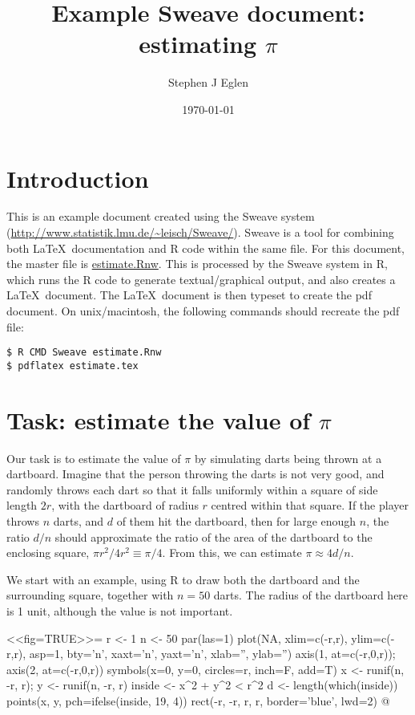 \documentclass[12pt]{article}
\begin{document}
\title{Example Sweave document: estimating $\pi$}
\author{Stephen J Eglen}

\date{\today}
\maketitle

\section{Introduction}

This is an example document created using the Sweave system
(\url{http://www.statistik.lmu.de/~leisch/Sweave/}).  Sweave is a
tool for combining both \LaTeX\ documentation and R code within the
same file.  For this document, the master file is \url{estimate.Rnw}.
This is processed by the Sweave system in R, which runs the R code to
generate textual/graphical output, and also creates a \LaTeX\ document.
The \LaTeX\ document is then typeset to create the pdf document.  On
unix/macintosh, the following commands should recreate the pdf file:

\begin{verbatim}
$ R CMD Sweave estimate.Rnw
$ pdflatex estimate.tex
\end{verbatim}

\section{Task: estimate the value of $\pi$}

Our task is to estimate the value of $\pi$ by simulating darts being
thrown at a dartboard.  Imagine that the person throwing the darts is
not very good, and randomly throws each dart so that it falls
uniformly within a square of side length $2r$, with the dartboard of
radius $r$ centred within that square.  If the player throws $n$
darts, and $d$ of them hit the dartboard, then for large enough $n$,
the ratio $d/n$ should approximate the ratio of the area of the
dartboard to the enclosing square, $ \pi r^2 / 4 r^2 \equiv \pi/4$.
From this, we can estimate $\pi \approx 4d/n$.

We start with an example, using R to draw both the dartboard and the
surrounding square, together with $n=50$ darts.  The radius of the
dartboard here is 1 unit, although the value is not important.

\begin{center}
<<fig=TRUE>>=
r <- 1
n <- 50
par(las=1)
plot(NA, xlim=c(-r,r), ylim=c(-r,r), asp=1, bty='n',
     xaxt='n', yaxt='n', xlab='', ylab='')
axis(1, at=c(-r,0,r)); axis(2, at=c(-r,0,r))
symbols(x=0, y=0, circles=r, inch=F, add=T)
x <- runif(n, -r, r);  y <- runif(n, -r, r)
inside <- x^2 + y^2 < r^2
d <- length(which(inside))
points(x, y, pch=ifelse(inside, 19, 4))
rect(-r, -r, r, r, border='blue', lwd=2)
@ 
\end{center}
\end{document}
